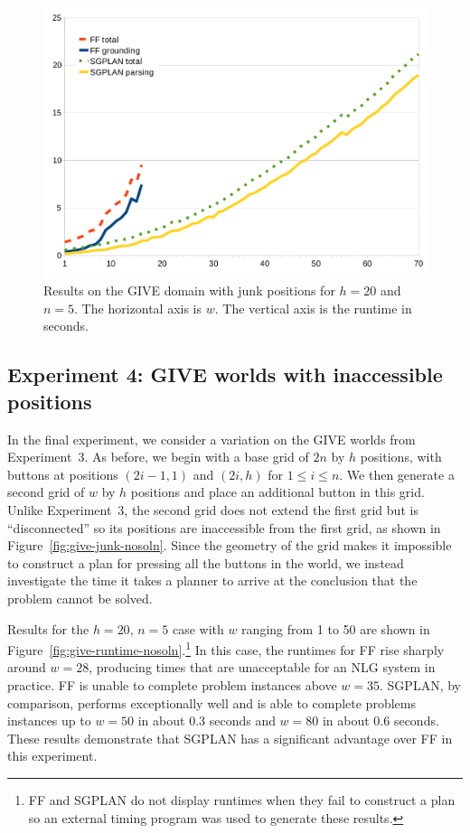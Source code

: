 \begin{figure}[t]
  \centering
  \includegraphics[width=0.75\columnwidth]{graph-exp3}
  \caption{Results on the GIVE domain with junk
    positions for $h=20$ and $n=5$. The horizontal axis is $w$.
    The vertical axis is the runtime in seconds.}
  \label{fig:give-runtime-junk}
\end{figure}


\subsection{Experiment 4: GIVE worlds with inaccessible positions}
\label{sec:experiment-4:-give}

In the final experiment, we consider a variation on the GIVE worlds from
Experiment~3. As before, we begin with a base grid of $2n$ by $h$
positions, with buttons at positions $(2i-1,1)$ and $(2i,h)$ for $1 \leq i
\leq n$. We then generate a second grid of $w$ by $h$ positions and place
an additional button in this grid. Unlike Experiment~3, the second grid
does not extend the first grid but is ``disconnected'' so its positions are
inaccessible from the first grid, as shown in
Figure~\ref{fig:give-junk-nosoln}. Since the geometry of the grid makes it
impossible to construct a plan for pressing all the buttons in the world,
we instead investigate the time it takes a planner to arrive at the
conclusion that the problem cannot be solved.

Results for the $h=20$, $n=5$ case with $w$ ranging from 1 to 50 are shown
in Figure~\ref{fig:give-runtime-nosoln}.\footnote{FF and SGPLAN do
 not display runtimes when they fail to construct a plan so an external timing
 program was used to generate these results.}
In this case, the runtimes for FF rise sharply around $w=28$, producing
times that are unacceptable for an NLG system in practice. FF is unable
to complete problem instances above $w=35$. SGPLAN, by comparison, performs
exceptionally well and is able to complete problems instances up to $w=50$
in about 0.3 seconds and $w=80$ in about 0.6 seconds. These results
demonstrate that SGPLAN has a significant advantage over FF in this
experiment. 

